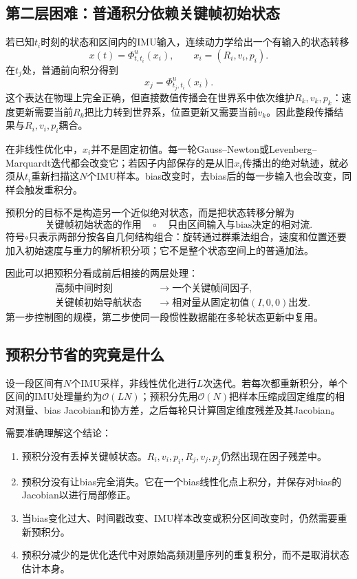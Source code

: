 \subsection{第二层困难：普通积分依赖关键帧初始状态}

若已知$t_i$时刻的状态和区间内的IMU输入，连续动力学给出一个有输入的状态转移
\[
    x(t)=\Phi^{u}_{t,t_i}(x_i),
    \qquad
    x_i=(R_i,v_i,p_i).
\]
在$t_j$处，普通前向积分得到
\[
    x_j=\Phi^{u}_{t_j,t_i}(x_i).
\]
这个表达在物理上完全正确，但直接数值传播会在世界系中依次维护$R_k,v_k,p_k$：速度更新需要当前$R_k$把比力转到世界系，位置更新又需要当前$v_k$。因此整段传播结果与$R_i,v_i,p_i$耦合。

在非线性优化中，$x_i$并不是固定初值。每一轮Gauss--Newton或Levenberg--Marquardt迭代都会改变它；若因子内部保存的是从旧$x_i$传播出的绝对轨迹，就必须从$t_i$重新扫描这$N$个IMU样本。bias改变时，去bias后的每一步输入也会改变，同样会触发重积分。

预积分的目标不是构造另一个近似绝对状态，而是把状态转移分解为
\[
    \boxed{
    \text{关键帧初始状态的作用}
    \quad\circ\quad
    \text{只由区间输入与bias决定的相对流}.
    }
\]
符号$\circ$只表示两部分按各自几何结构组合：旋转通过群乘法组合，速度和位置还要加入初始速度与重力的解析积分项；它不是整个状态空间上的普通加法。

因此可以把预积分看成前后相接的两层处理：
\[
\boxed{
\begin{aligned}
    &\text{高频中间时刻}
      &&\longrightarrow\text{一个关键帧间因子},\\
    &\text{关键帧初始导航状态}
      &&\longrightarrow\text{相对量从固定初值$(I,0,0)$出发}.
\end{aligned}
}
\]
第一步控制图的规模，第二步使同一段惯性数据能在多轮状态更新中复用。

\subsection{预积分节省的究竟是什么}

设一段区间有$N$个IMU采样，非线性优化进行$L$次迭代。若每次都重新积分，单个区间的IMU处理量约为$\mathcal O(LN)$；预积分先用$\mathcal O(N)$把样本压缩成固定维度的相对测量、bias Jacobian和协方差，之后每轮只计算固定维度残差及其Jacobian。

需要准确理解这个结论：
\begin{enumerate}
    \item 预积分没有丢掉关键帧状态。$R_i,v_i,p_i,R_j,v_j,p_j$仍然出现在因子残差中。
    \item 预积分没有让bias完全消失。它在一个bias线性化点上积分，并保存对bias的Jacobian以进行局部修正。
    \item 当bias变化过大、时间戳改变、IMU样本改变或积分区间改变时，仍然需要重新预积分。
    \item 预积分减少的是优化迭代中对原始高频测量序列的重复积分，而不是取消状态估计本身。
\end{enumerate}

